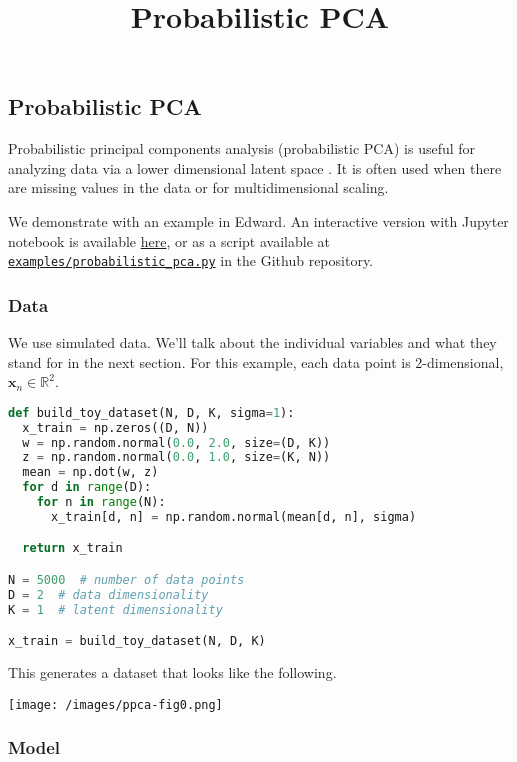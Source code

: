\title{Probabilistic PCA}

\subsection{Probabilistic PCA}

Probabilistic principal components analysis (probabilistic PCA) is
useful for analyzing data via a lower dimensional latent space
\citep{tipping1999probabilistic}. It is often
used when there are missing values in the data or for multidimensional
scaling.

We demonstrate with an example in Edward.
An interactive version with Jupyter notebook is available
\href{http://nbviewer.jupyter.org/github/blei-lab/edward/blob/master/docs/notebooks/probabilistic_pca.ipynb}{here},
or as a script available at
\href{https://github.com/blei-lab/edward/blob/master/examples/probabilistic_pca.py}
{\texttt{examples/probabilistic_pca.py}} in the Github repository.

\subsubsection{Data}

We use simulated data. We'll talk about the individual variables and
what they stand for in the next section. For this example, each data
point is 2-dimensional, $\mathbf{x}_n\in\mathbb{R}^2$.

\begin{lstlisting}[language=Python]
def build_toy_dataset(N, D, K, sigma=1):
  x_train = np.zeros((D, N))
  w = np.random.normal(0.0, 2.0, size=(D, K))
  z = np.random.normal(0.0, 1.0, size=(K, N))
  mean = np.dot(w, z)
  for d in range(D):
    for n in range(N):
      x_train[d, n] = np.random.normal(mean[d, n], sigma)

  return x_train

N = 5000  # number of data points
D = 2  # data dimensionality
K = 1  # latent dimensionality

x_train = build_toy_dataset(N, D, K)
\end{lstlisting}

This generates a dataset that looks like the following.

\texttt{[image: /images/ppca-fig0.png]}

\subsubsection{Model}

